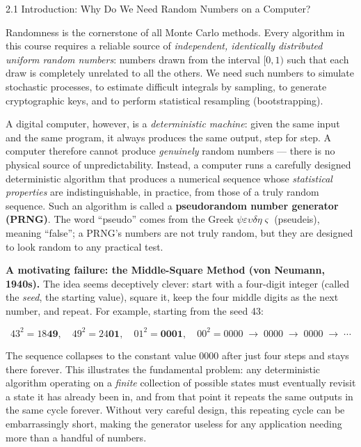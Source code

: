 \documentclass[aspectratio=169,10pt]{beamer}
\begin{document}
\begin{frame}[allowframebreaks]{2.1 Introduction: Why Do We Need Random Numbers on a Computer?}

Randomness is the cornerstone of all Monte Carlo methods.  Every algorithm in
this course requires a reliable source of \emph{independent, identically
distributed uniform random numbers}: numbers drawn from the interval $[0,1)$
such that each draw is completely unrelated to all the others.  We need such
numbers to simulate stochastic processes, to estimate difficult integrals by
sampling, to generate cryptographic keys, and to perform statistical resampling
(bootstrapping).

A digital computer, however, is a \emph{deterministic machine}: given the
same input and the same program, it always produces the same output, step for
step.  A computer therefore cannot produce \emph{genuinely} random numbers ---
there is no physical source of unpredictability.  Instead, a computer runs a
carefully designed deterministic algorithm that produces a numerical sequence
whose \emph{statistical properties} are indistinguishable, in practice, from
those of a truly random sequence.  Such an algorithm is called a
\textbf{pseudorandom number generator (PRNG)}.  The word ``pseudo'' comes from
the Greek $\psi\varepsilon\upsilon\delta\eta\varsigma$ (pseudeis), meaning
``false''; a PRNG's numbers are not truly random, but they are designed to
look random to any practical test.

\medskip
\textbf{A motivating failure: the Middle-Square Method (von Neumann, 1940s).}
The idea seems deceptively clever: start with a four-digit integer (called the
\emph{seed}, the starting value), square it, keep the four middle digits as
the next number, and repeat.  For example, starting from the seed 43:

\[
  43^2 = 18\mathbf{49}, \quad
  49^2 = 24\mathbf{01}, \quad
  01^2 = \mathbf{0001}, \quad
  00^2 = 0000 \;\to\; 0000 \;\to\; 0000 \;\to\; \cdots
\]

The sequence collapses to the constant value 0000 after just four steps and
stays there forever.  This illustrates the fundamental problem: any
deterministic algorithm operating on a \emph{finite} collection of possible
states must eventually revisit a state it has already been in, and from that
point it repeats the same outputs in the same cycle forever.  Without very
careful design, this repeating cycle can be embarrassingly short, making the
generator useless for any application needing more than a handful of numbers.


\end{frame}
\end{document}
